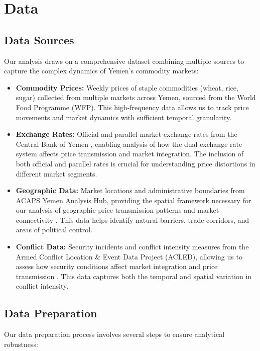 \section{Data}
\small  %
\setlength{\parskip}{0.3em}  %

\subsection{Data Sources}
Our analysis draws on a comprehensive dataset combining multiple sources to capture the complex dynamics of Yemen's commodity markets:

\begin{itemize}[nosep]
\item \textbf{Commodity Prices:} Weekly prices of staple commodities (wheat, rice, sugar) collected from multiple markets across Yemen, sourced from the World Food Programme (WFP). This high-frequency data allows us to track price movements and market dynamics with sufficient temporal granularity.

\item \textbf{Exchange Rates:} Official and parallel market exchange rates from the Central Bank of Yemen \citep{worldbank2022yemen}, enabling analysis of how the dual exchange rate system affects price transmission and market integration. The inclusion of both official and parallel rates is crucial for understanding price distortions in different market segments.

\item \textbf{Geographic Data:} Market locations and administrative boundaries from ACAPS Yemen Analysis Hub, providing the spatial framework necessary for our analysis of geographic price transmission patterns and market connectivity \citep{anselin1988spatial}. This data helps identify natural barriers, trade corridors, and areas of political control.

\item \textbf{Conflict Data:} Security incidents and conflict intensity measures from the Armed Conflict Location \& Event Data Project (ACLED), allowing us to assess how security conditions affect market integration and price transmission \citep{mansour2021market}. This data captures both the temporal and spatial variation in conflict intensity.
\end{itemize}

\subsection{Data Preparation}
Our data preparation process involves several steps to ensure analytical robustness:

